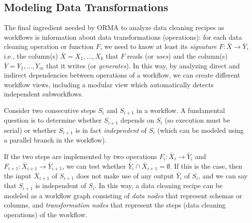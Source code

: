 \documentclass[conference]{ijdc-v14}
\newcommand{\orma}{\textsf{ORMA}\xspace}  %
\begin{document}
\subsection{Modeling Data Transformations}


The final ingredient needed by \orma to analyze data cleaning recipes as workflows is information
about {data transformations} (operations): for each data cleaning operation or function $F$, we need
to know at least its \emph{signature} $F: \bar X \to \bar Y$, i.e., the column(s)
$\bar X = X_1,\dots,X_k$ that $F$ reads (or \emph{uses}) and the column(s) $\bar Y = Y_1,\dots, Y_m$
that it writes (or \emph{generates}). In this way, by analyzing direct and indirect dependencies
between operations of a workflow, we can create different workflow views, including a modular view
which automatically detects independent subworkflows.

Consider two consecutive steps $S_i$ and $S_{i+1}$ in a workflow. A fundamental question is to
determine whether $S_{i+1}$ depends on $S_i$ (so execution must be serial) or whether $S_{i+1}$ is
in fact \emph{independent} of $S_i$ (which can be modeled using a  parallel branch in the workflow).

If the two steps are implemented by two operations $F_i: \bar X_i \to \bar Y_i$ and
$F_{i+1}: \bar X_{i+1} \to \bar Y_{i+1}$, we can test whether
$\bar Y_i \cap \bar X_{i+1} = \emptyset$. If this is the case, then the input $\bar X_{i+1}$ of
$S_{i+1}$ does not make use of any output $\bar Y_i$ of $S_i$, and we can say that $S_{i+1}$ is
{independent} of $S_i$.  In this way, a data cleaning recipe can be modeled as a workflow graph
consisting of \emph{data nodes} that represent schemas or columns, and \emph{transformation nodes}
that represent the steps (data cleaning operations) of the workflow. 
\end{document}
